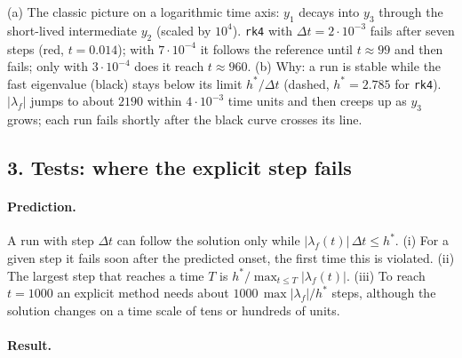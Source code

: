 \documentclass[11pt,a4paper]{article}
\begin{document}
(a) The classic picture on a logarithmic time axis: $y_1$ decays into $y_3$
through the short-lived intermediate $y_2$ (scaled by $10^4$). \texttt{rk4}
with $\Delta t = 2\cdot10^{-3}$ fails after seven steps (red, $t = 0.014$); with
$7\cdot10^{-4}$ it follows the reference until $t \approx 99$ and then fails;
only with $3\cdot10^{-4}$ does it reach $t \approx 960$. (b) Why: a run is
stable while the fast eigenvalue (black) stays below its limit $h^*/\Delta t$
(dashed, $h^* = 2.785$ for \texttt{rk4}). $|\lambda_f|$ jumps to about
$2190$ within $4\cdot10^{-3}$ time units and then creeps up as $y_3$ grows;
each run fails shortly after the black curve crosses its line.

\newpage
\subsection*{3. Tests: where the explicit step fails}

\paragraph{Prediction.} A run with step $\Delta t$ can follow the solution
only while $|\lambda_f(t)|\,\Delta t \le h^*$. (i) For a given step it fails
soon after the predicted onset, the first time this is violated. (ii) The
largest step that reaches a time $T$ is $h^*/\max_{t \le T}|\lambda_f(t)|$.
(iii) To reach $t = 1000$ an explicit method needs about
$1000\,\max|\lambda_f|/h^*$ steps, although the solution changes on a time
scale of tens or hundreds of units.

\paragraph{Result.}
\begin{center}
\small

\end{center}
\end{document}

